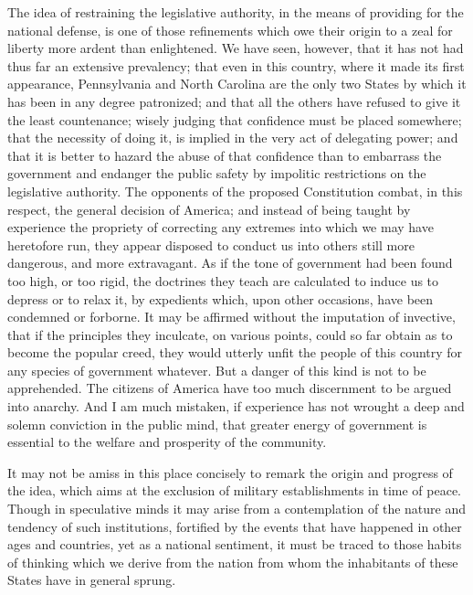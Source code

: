 The idea of restraining the legislative authority, in the means of providing for the national defense, is one of those refinements which owe their origin to a zeal for liberty more ardent than enlightened. 
We have seen, however, that it has not had thus far an extensive prevalency; that even in this country, where it made its first appearance, Pennsylvania and North Carolina are the only two States by which it has been in any degree patronized; and that all the others have refused to give it the least countenance; wisely judging that confidence must be placed somewhere; that the necessity of doing it, is implied in the very act of delegating power; and that it is better to hazard the abuse of that confidence than to embarrass the government and endanger the public safety by impolitic restrictions on the legislative authority. 
The opponents of the proposed Constitution combat, in this respect, the general decision of America; and instead of being taught by experience the propriety of correcting any extremes into which we may have heretofore run, they appear disposed to conduct us into others still more dangerous, and more extravagant. 
As if the tone of government had been found too high, or too rigid, the doctrines they teach are calculated to induce us to depress or to relax it, by expedients which, upon other occasions, have been condemned or forborne. 
It may be affirmed without the imputation of invective, that if the principles they inculcate, on various points, could so far obtain as to become the popular creed, they would utterly unfit the people of this country for any species of government whatever. 
But a danger of this kind is not to be apprehended. 
The citizens of America have too much discernment to be argued into anarchy. 
And I am much mistaken, if experience has not wrought a deep and solemn conviction in the public mind, that greater energy of government is essential to the welfare and prosperity of the community.

It may not be amiss in this place concisely to remark the origin and progress of the idea, which aims at the exclusion of military establishments in time of peace. 
Though in speculative minds it may arise from a contemplation of the nature and tendency of such institutions, fortified by the events that have happened in other ages and countries, yet as a national sentiment, it must be traced to those habits of thinking which we derive from the nation from whom the inhabitants of these States have in general sprung.


